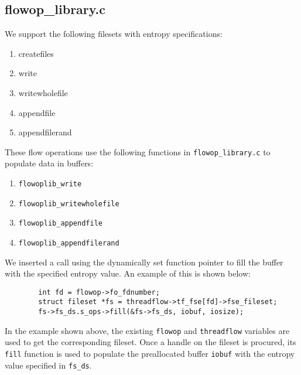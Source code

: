 \subsection{flowop\_library.c}
We support the following filesets with entropy specifications:
\begin{enumerate}
\item createfiles
\item write
\item writewholefile
\item appendfile
\item appendfilerand
\end{enumerate}

\noindent These flow operations use the following functions in \verb+flowop_library.c+ to populate data in buffers:
\begin{enumerate}
\item \verb+flowoplib_write+
\item \verb+flowoplib_writewholefile+
\item \verb+flowoplib_appendfile+
\item \verb+flowoplib_appendfilerand+
\end{enumerate}

\noindent We inserted a call using the dynamically set function pointer to fill the buffer with the specified entropy value. An example of this is shown below:
\newline
\lstset{language=C}
\begin{lstlisting}
		int fd = flowop->fo_fdnumber;
		struct fileset *fs = threadflow->tf_fse[fd]->fse_fileset;
		fs->fs_ds.s_ops->fill(&fs->fs_ds, iobuf, iosize);
\end{lstlisting}

\noindent In the example shown above, the existing \verb+flowop+ and \verb+threadflow+ variables are used to get the corresponding fileset. Once a handle on the fileset is procured, its \verb+fill+ function is used to populate the preallocated buffer \verb+iobuf+ with the entropy value specified in \verb+fs_ds+.
